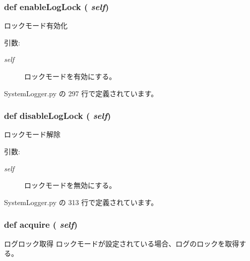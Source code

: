 \subsubsection{\setlength{\rightskip}{0pt plus 5cm}def enableLogLock ( {\em self})}\label{classsource__py_1_1_system_logger_1_1_log_stream_4350c6193e3671c34a363eaf818f9277}


ロックモード有効化 

\begin{Desc}
\item[引数:]
\begin{description}
\item[{\em self}]ロックモードを有効にする。 \end{description}
\end{Desc}


 SystemLogger.py の 297 行で定義されています。
\subsubsection{\setlength{\rightskip}{0pt plus 5cm}def disableLogLock ( {\em self})}\label{classsource__py_1_1_system_logger_1_1_log_stream_6c494f303781da73ef2d3c67acfaed65}


ロックモード解除 

\begin{Desc}
\item[引数:]
\begin{description}
\item[{\em self}]ロックモードを無効にする。 \end{description}
\end{Desc}


 SystemLogger.py の 313 行で定義されています。
\subsubsection{\setlength{\rightskip}{0pt plus 5cm}def acquire ( {\em self})}\label{classsource__py_1_1_system_logger_1_1_log_stream_6437791031b9063b540789b8fe92ab18}


ログロック取得 ロックモードが設定されている場合、ログのロックを取得する。 

